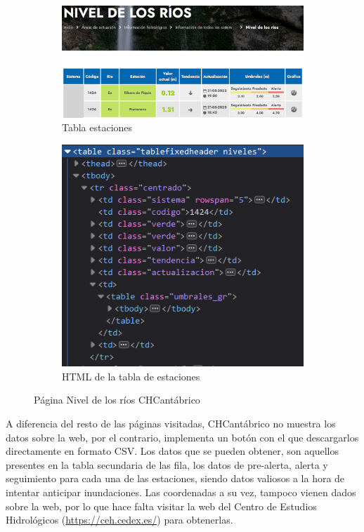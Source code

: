 \begin{figure} [H]
	\centering
	\begin{subfigure}{.5\textwidth}
		\centering
		\includegraphics[width=.7\linewidth]{fig/CHCantabricoCode.png}
		\caption{Tabla estaciones}
		\label{fig:sub9}
	\end{subfigure}%
	\begin{subfigure}{.5\textwidth}
		\centering
		\includegraphics[width=.7\linewidth]{fig/CHCantabricoCodeHTML.png}
		\caption{HTML de la tabla de estaciones}
		\label{fig:sub10}
	\end{subfigure}
	\caption{Página Nivel de los ríos CHCantábrico}
	\label{fig:ej30}
\end{figure}

A diferencia del resto de las páginas visitadas, CHCantábrico no muestra los datos sobre la web, por el contrario, implementa un botón con el que descargarlos directamente en formato CSV. Los datos que se pueden obtener, son aquellos presentes en la tabla secundaria de las fila, los datos de pre-alerta, alerta y seguimiento para cada una de las estaciones, siendo datos valiosos a la hora de intentar anticipar inundaciones. Las coordenadas a su vez, tampoco vienen dados sobre la web, por lo que hace falta visitar la web del Centro de Estudios Hidrológicos (\url{https://ceh.cedex.es/}) para obtenerlas.

